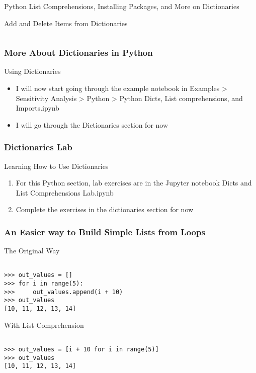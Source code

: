 \documentclass[handout, 11pt]{beamer}
\begin{document}
\begin{section}{Python List Comprehensions, Installing Packages, and More on Dictionaries}
\begin{frame}[fragile]
\begin{block}{Add and Delete Items from Dictionaries}
\begin{verbatim}
\end{verbatim}
\end{block}
\end{frame}
\begin{frame}
\frametitle{More About Dictionaries in Python}
{
\begin{block}{Using Dictionaries}
\begin{itemize}
\item I will now start going through the example notebook in Examples > Sensitivity Analysis > Python > Python Dicts, List comprehensions, and Imports.ipynb
\item I will go through the Dictionaries section for now
\end{itemize}
\end{block}
}
\end{frame}
\begin{frame}
\frametitle{Dictionaries Lab}
{
\begin{block}{Learning How to Use Dictionaries}
\begin{enumerate}
\item For this Python section, lab exercises are in the Jupyter notebook Dicts and List Comprehensions Lab.ipynb
\item Complete the exercises in the dictionaries section for now
\end{enumerate}
\vfill
\end{block}
}
\label{labs:dictionaries-lab-1}
\end{frame}
\begin{frame}[fragile]
\frametitle{An Easier way to Build Simple Lists from Loops}
\small
\begin{block}{The Original Way}
\begin{verbatim}

>>> out_values = []
>>> for i in range(5):
>>>     out_values.append(i + 10)
>>> out_values
[10, 11, 12, 13, 14]

\end{verbatim}
\end{block}
\begin{block}{With List Comprehension}
\begin{verbatim}

>>> out_values = [i + 10 for i in range(5)]
>>> out_values
[10, 11, 12, 13, 14]


\end{verbatim}
\end{block}
\end{frame}
\end{section}
\end{document}
